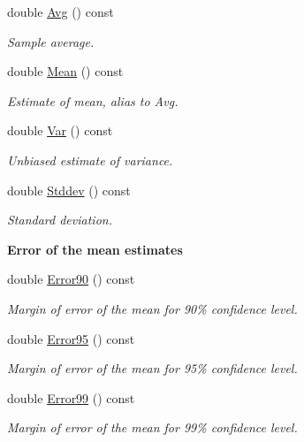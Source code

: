 \begin{DoxyCompactItemize}
double \hyperlink{classns3_1_1Average_aa586e1db7ae9618ceada168d8f2ae390}{Avg} () const 
\begin{DoxyCompactList}\small\item\em Sample average. \end{DoxyCompactList}\item 
double \hyperlink{classns3_1_1Average_a750277f678abfdc0184d697238975b93}{Mean} () const 
\begin{DoxyCompactList}\small\item\em Estimate of mean, alias to Avg. \end{DoxyCompactList}\item 
double \hyperlink{classns3_1_1Average_af81b1dec6bcafabf4ed63f43fdd8f568}{Var} () const 
\begin{DoxyCompactList}\small\item\em Unbiased estimate of variance. \end{DoxyCompactList}\item 
double \hyperlink{classns3_1_1Average_ac7536c397973130662606c1019049503}{Stddev} () const 
\begin{DoxyCompactList}\small\item\em Standard deviation. \end{DoxyCompactList}\end{DoxyCompactItemize}
\begin{Indent}{\bf Error of the mean estimates}\par
\begin{DoxyCompactItemize}
\item 
double \hyperlink{classns3_1_1Average_a95246b3ab05e66555741842b22586068}{Error90} () const 
\begin{DoxyCompactList}\small\item\em Margin of error of the mean for 90\% confidence level. \end{DoxyCompactList}\item 
double \hyperlink{classns3_1_1Average_a578e4e7bc664cf3e55e7d6b48bbd1001}{Error95} () const 
\begin{DoxyCompactList}\small\item\em Margin of error of the mean for 95\% confidence level. \end{DoxyCompactList}\item 
double \hyperlink{classns3_1_1Average_a803b9bdfb79bb69c59ec3b88bfd7b7a0}{Error99} () const 
\begin{DoxyCompactList}\small\item\em Margin of error of the mean for 99\% confidence level. \end{DoxyCompactList}\end{DoxyCompactItemize}
\end{Indent}
